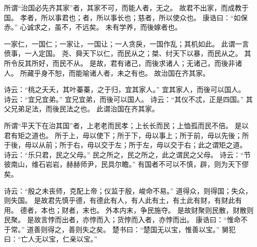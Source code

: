 \documentclass[twoside,openany]{book}
\begin{document}
\begin{pinyinscope}
所谓“治国必先齐其家”者，其家不可，而能人者，无之。
故君不出家，而成教于国。
孝者，所以事君也；者，所以事长也；慈者，所以使众也。
康诰曰：“如保赤。”
心诚求之，虽不，不远矣。
未有学养，而後嫁者也。

一家仁，一国仁；一家让，一国让；一人贪戾，一国作乱；其机如此。
此谓一言偾事，一人定国。
尧、舜天下以仁，而民从之；桀、纣天下以暴，而民从之。
其所令反其所好，而民不从。
是故，君有诸己，而後求诸人；无诸己，而後非诸人。
所藏乎身不恕，而能喻诸人者，未之有也。
故治国在齐其家。

诗云：“桃之夭夭，其叶蓁蓁，之于归，宜其家人。”
宜其家人，而後可以国人。
诗云：“宜兄宜弟。”
宜兄宜弟，而後可以国人。
诗云：“其仪不忒，正是四国。”
其父兄弟足法，而後民法之也。
此谓治国在齐其家。

%

所谓“平天下在治其国”者，上老老而民孝；上长长而民；上恤孤而民不倍。
是以君有矩之道也。
所于上，毋以使下；所于下，毋以事上；所于前，毋以先後；所于後，毋以从前；所于右，毋以交于左；所于左，毋以交于右；此之谓矩之道。
诗云：“乐只君，民之父母。”
民之所之，民之所之，此之谓民之父母。
诗云：“节彼南山，维石岩岩，赫赫师尹，民具尔瞻。”
有国者不可以不慎，辟，则为天下僇矣。

诗云：“殷之未丧师，克配上帝；仪监于殷，峻命不易。”
道得众，则得国；失众，则失国。
是故君先慎乎德，有德此有人，有人此有土，有土此有财，有财此有用。
德者，本也；财者，末也。
外本内末，争民施夺。
是故财聚则民散，财散则民聚。
是故言悖而出者，亦悖而入；货悖而入者，亦悖而出。
康诰曰：“惟命不于常。”
道善则得之，善则失之矣。
楚书曰：“楚国无以宝，惟善以宝。”
舅犯曰：“亡人无以宝，仁亲以宝。”


\end{pinyinscope}
\end{document}
